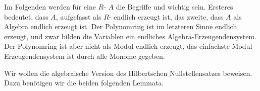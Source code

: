 
Im Folgenden werden für eine
$R$-
$A$ die Begriffe
und
wichtig sein. Ersteres bedeutet, dass $A$, aufgefasst als
$R$-
endlich erzeugt ist, das zweite, dass $A$ als Algebra endlich erzeugt ist. Der Polynomring
 ist im letzteren Sinne endlich erzeugt, und zwar bilden die Variablen ein endliches Algebra-Erzeugendensystem. Der Polynomring ist aber nicht als Modul endlich erzeugt, das einfachste Modul-Erzeugendensystem ist durch alle Monome gegeben.

Wir wollen die algebraische Version des Hilbertschen Nullstellensatzes beweisen. Dazu benötigen wir die beiden folgenden Lemmata.





